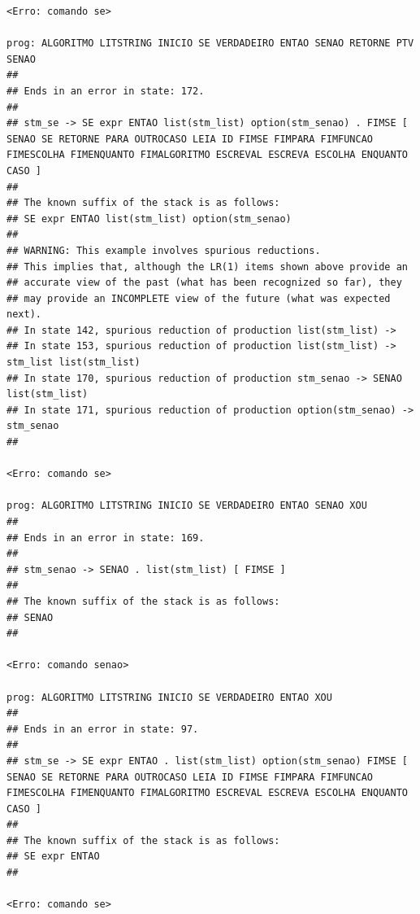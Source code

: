 \documentclass[hidelinks,12pt]{article}
\begin{document}
\begin{lstlisting}
<Erro: comando se>

prog: ALGORITMO LITSTRING INICIO SE VERDADEIRO ENTAO SENAO RETORNE PTV SENAO 
##
## Ends in an error in state: 172.
##
## stm_se -> SE expr ENTAO list(stm_list) option(stm_senao) . FIMSE [ SENAO SE RETORNE PARA OUTROCASO LEIA ID FIMSE FIMPARA FIMFUNCAO FIMESCOLHA FIMENQUANTO FIMALGORITMO ESCREVAL ESCREVA ESCOLHA ENQUANTO CASO ]
##
## The known suffix of the stack is as follows:
## SE expr ENTAO list(stm_list) option(stm_senao) 
##
## WARNING: This example involves spurious reductions.
## This implies that, although the LR(1) items shown above provide an
## accurate view of the past (what has been recognized so far), they
## may provide an INCOMPLETE view of the future (what was expected next).
## In state 142, spurious reduction of production list(stm_list) -> 
## In state 153, spurious reduction of production list(stm_list) -> stm_list list(stm_list) 
## In state 170, spurious reduction of production stm_senao -> SENAO list(stm_list) 
## In state 171, spurious reduction of production option(stm_senao) -> stm_senao 
##

<Erro: comando se>

prog: ALGORITMO LITSTRING INICIO SE VERDADEIRO ENTAO SENAO XOU 
##
## Ends in an error in state: 169.
##
## stm_senao -> SENAO . list(stm_list) [ FIMSE ]
##
## The known suffix of the stack is as follows:
## SENAO 
##

<Erro: comando senao>

prog: ALGORITMO LITSTRING INICIO SE VERDADEIRO ENTAO XOU 
##
## Ends in an error in state: 97.
##
## stm_se -> SE expr ENTAO . list(stm_list) option(stm_senao) FIMSE [ SENAO SE RETORNE PARA OUTROCASO LEIA ID FIMSE FIMPARA FIMFUNCAO FIMESCOLHA FIMENQUANTO FIMALGORITMO ESCREVAL ESCREVA ESCOLHA ENQUANTO CASO ]
##
## The known suffix of the stack is as follows:
## SE expr ENTAO 
##

<Erro: comando se>


\end{lstlisting}
\end{document}
